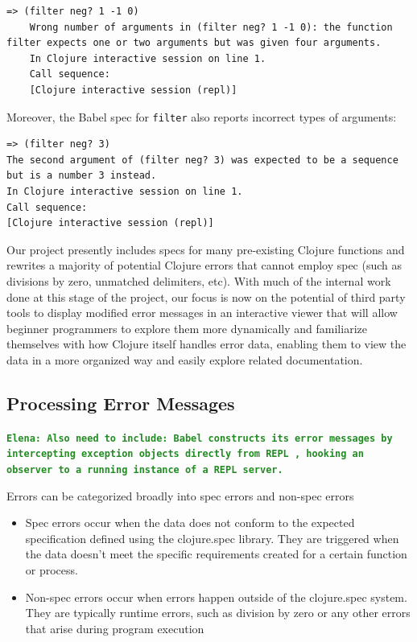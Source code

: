 \documentclass[12pt]{article}
\newcommand{\comment}[1]{{\bf \tt  {#1}}}
\newcommand{\emcomment}[1]{\textcolor{ForestGreen}{\comment{Elena: {#1}}}}
\begin{document}
\begin{lstlisting}[breaklines=true, basicstyle=\ttfamily]
    => (filter neg? 1 -1 0)
    Wrong number of arguments in (filter neg? 1 -1 0): the function filter expects one or two arguments but was given four arguments.
    In Clojure interactive session on line 1.
    Call sequence:
    [Clojure interactive session (repl)]
\end{lstlisting}

Moreover, the Babel spec for \texttt{filter} also reports incorrect types of arguments:

\begin{lstlisting}[breaklines=true, basicstyle=\ttfamily]
=> (filter neg? 3)
The second argument of (filter neg? 3) was expected to be a sequence but is a number 3 instead.
In Clojure interactive session on line 1.
Call sequence:
[Clojure interactive session (repl)]
\end{lstlisting}

Our project presently includes specs for many pre-existing Clojure functions and rewrites a majority of potential Clojure errors that cannot employ spec (such as divisions by zero, unmatched delimiters, etc). With much of the internal work done at this stage of the project, our focus is now on the potential of third party tools to display modified error messages in an interactive viewer that will allow beginner programmers to explore them more dynamically and familiarize themselves with how Clojure itself handles error data, enabling them to view the data in a more organized way and easily explore related documentation.

\subsection{Processing Error Messages}\label{subsec:classification}
\emcomment{Also need to include:
Babel constructs its error messages by intercepting exception objects directly from REPL , hooking an observer to a running instance of a REPL server.}

Errors can be categorized broadly into spec errors and non-spec errors
\begin{itemize}

	\item Spec errors occur when the data does not conform to the expected specification defined using the clojure.spec library. They are triggered when the data doesn't meet the specific requirements created for a certain function or process.
	
	\item Non-spec errors occur when errors happen outside of the clojure.spec system. They are typically runtime errors, such as division by zero or any other errors that arise during program execution

\end{itemize}
\end{document}
